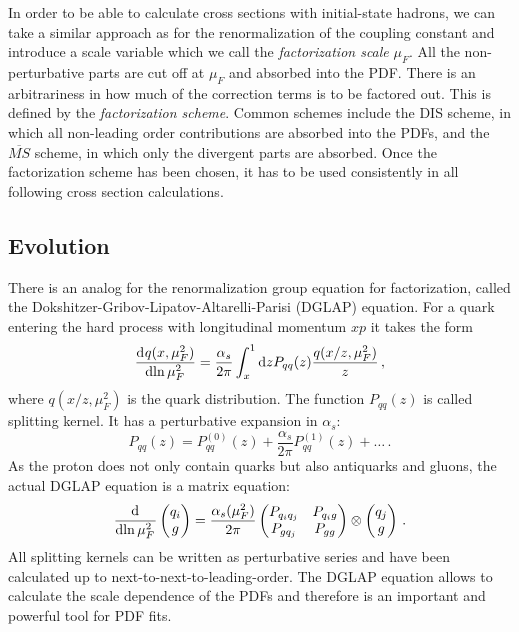 In order to be able to calculate cross sections with initial-state hadrons, we can take a similar approach as for the renormalization of the coupling constant and introduce a scale variable which we call the \textit{factorization scale} $\mu_F$.
All the non-perturbative parts are cut off at $\mu_F$ and absorbed into the PDF.
There is an arbitrariness in how much of the correction terms is to be factored out.
This is defined by the \textit{factorization scheme}.
Common schemes include the DIS scheme, in which all non-leading order contributions are absorbed into the PDFs, and the $\overline{MS}$ scheme, in which only the divergent parts are absorbed.
Once the factorization scheme has been chosen, it has to be used consistently in all following cross section calculations.
%
\subsection{Evolution}
There is an analog for the renormalization group equation for factorization, called the Dokshitzer-Gribov-Lipatov-Altarelli-Parisi (DGLAP) equation.
For a quark entering the hard process with longitudinal momentum $xp$ it takes the form
%
\begin{equation}
	\dod{q(x,\mu_F^2)}{\ln{\mu_F^2}} = \frac{\alpha_s}{2 \pi} \int_x^1 \dif z P_{qq}(z) \frac{q(x/z,\mu_F^2)}{z} \, ,
\end{equation}
%
where $q(x/z,\mu_F^2)$ is the quark distribution.
The function $P_{qq}(z)$ is called splitting kernel.
It has a perturbative expansion in $\alpha_s$:
%
\begin{equation}
	P_{qq}(z) = P_{qq}^{(0)}(z) + \frac{\alpha_s}{2 \pi} P_{qq}^{(1)}(z) + \dots \, .
\end{equation}
%
As the proton does not only contain quarks but also antiquarks and gluons, the actual DGLAP equation is a matrix equation:
%
\begin{equation}
	\dod{}{\ln{\mu_F^2}} \begin{pmatrix} q_i \\ g \end{pmatrix} = \frac{\alpha_s(\mu_F^2)}{2 \pi}
	\begin{pmatrix}
		P_{q_i q_j}	&	P_{q_i g} \\
		P_{g q_j}	&	P_{gg}
	\end{pmatrix}
	\otimes \begin{pmatrix} q_j \\ g \end{pmatrix} \, .
\end{equation}
%
All splitting kernels can be written as perturbative series and have been calculated up to next-to-next-to-leading-order\cite{splittingkernel1,splittingkernel2}. 
The DGLAP equation allows to calculate the scale dependence of the PDFs and therefore is an important and powerful tool for PDF fits.
%
